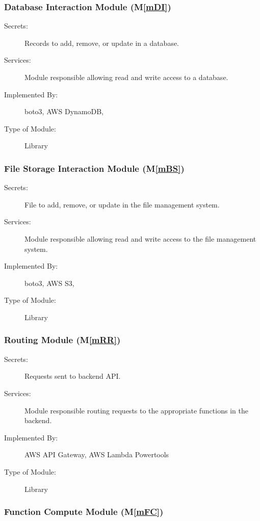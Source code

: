 \documentclass[12pt, titlepage]{article}
\newcommand{\mref}[1]{M\ref{#1}}
\begin{document}
\subsubsection{Database Interaction Module (\mref{mDI})}

\begin{description}
  \item[Secrets:] Records to add, remove, or update in a database.
  \item[Services:] Module responsible allowing read and write access
    to a database.
  \item[Implemented By:] boto3, AWS DynamoDB, \progname
  \item[Type of Module:] Library
\end{description}

\subsubsection{File Storage Interaction Module (\mref{mBS})}

\begin{description}
  \item[Secrets:] File to add, remove, or update in the file management system.
  \item[Services:] Module responsible allowing read and write access
    to the file management system.
  \item[Implemented By:] boto3, AWS S3, \progname
  \item[Type of Module:] Library
\end{description}

\subsubsection{Routing Module (\mref{mRR})}

\begin{description}
  \item[Secrets:] Requests sent to backend API.
  \item[Services:] Module responsible routing requests to the
    appropriate functions in the backend.
  \item[Implemented By:] AWS API Gateway, AWS Lambda Powertools
  \item[Type of Module:] Library
\end{description}

\subsubsection{Function Compute Module (\mref{mFC})}
\end{document}
